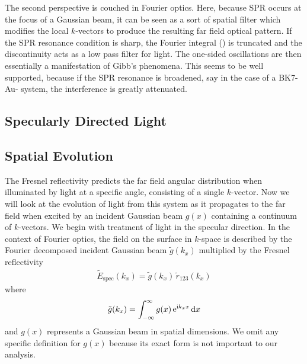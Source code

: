 \documentclass[a4paper,titlepage,onecolumn]{report}
\begin{document}
The second perspective is couched in Fourier optics.  Here, because
SPR occurs at the focus of a Gaussian beam, it can be seen as a sort of
spatial filter which modifies the local $k$-vectors to produce
the resulting far field optical pattern.  If the SPR resonance condition is
sharp, the Fourier integral () is truncated and
the discontinuity acts as a low pass filter for light.  The one-sided
oscillations are then essentially a manifestation of Gibb's phenomena.
This seems to be well supported, because if the SPR resonance is broadened,
say in the case of a BK7-Au- system, the interference is greatly
attenuated.
%

\subsection{Specularly Directed Light}


\subsection{Spatial Evolution}
The Fresnel reflectivity predicts the far field angular distribution when
illuminated by light at a specific angle, consisting of a single
$k$-vector.  Now we will look at the evolution of light from this system
as it propagates to the far field when excited by an incident Gaussian beam
$g(x)$ containing a continuum of $k$-vectors.  We begin with treatment of
light in the specular direction.  In the context of Fourier
optics, the field on the surface in $k$-space is described by the Fourier
decomposed incident Gaussian beam $\tilde{g}(k_x)$ multiplied by the
Fresnel reflectivity
\begin{align}
\tilde{E}_\text{spec}(k_x)=\tilde{g}(k_x)\,\tilde{r}_\text{123}(k_x)
\end{align}
where
\begin{align}
\tilde{g}(k_x) = \int_{-\infty}^{\infty} g(x)\, {\mathrm{e}}^{{\mathrm{i}} k_x x} \,\mathrm{d} x
\end{align}
and $g(x)$ represents a Gaussian beam in spatial dimensions.  We omit any 
specific definition for $g(x)$ because its exact form
is not important to our analysis.
\end{document}
